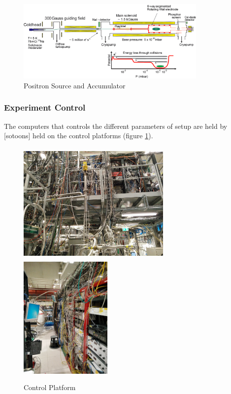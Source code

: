 \documentclass{article}
\begin{document}
 
\begin{figure}[h]
\centering
\includegraphics[width=110 mm, height=40mm]{fullsetup}
\caption{Positron Source and Accumulator}
\end{figure}

\subsubsection{Experiment Control}

The computers that controls the different parameters of setup are held by [sotoons] held on the control platforms (figure \ref{platform}). 


\begin{figure}[h]

\includegraphics[height=60mm, width=75mm]{control_platform-1}
\includegraphics[width=45mm]{control_plattform2}
\caption{Control Platform}
\label{platform}
\end{figure}		
	
\end{document}
